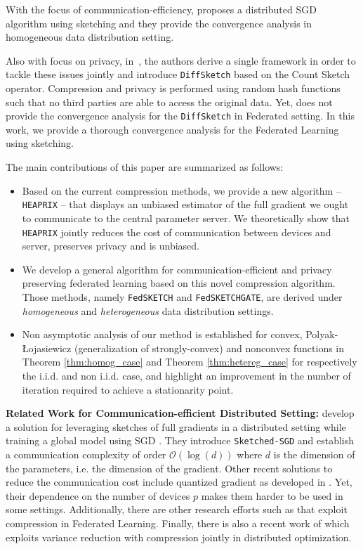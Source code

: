 \documentclass[review,onefignum,onetabnum]{siamart190516}
\newcommand{\pl}{Polyak-\L{}ojasiewicz}
\begin{document}
With the focus of communication-efficiency, \cite{ivkin2019communication} proposes a distributed SGD algorithm using sketching and they provide the convergence analysis in homogeneous data distribution setting. 

Also with focus on privacy,  in~\cite{li2019privacy}, the authors derive a single framework in order to tackle these issues jointly and introduce \texttt{DiffSketch} based on the Count Sketch operator. Compression and privacy is performed using random hash functions such that no third parties are able to access the original data. Yet, \cite{li2019privacy} does not provide the convergence analysis for the \texttt{DiffSketch} in Federated setting. In this work, we provide a thorough convergence analysis for the Federated Learning using sketching.

The main contributions of this paper are summarized as follows:
\begin{itemize}
    \item Based on the current compression methods, we provide a new algorithm -- \texttt{HEAPRIX} -- that displays an unbiased estimator of the full gradient we ought to communicate to the central parameter server. We theoretically show that \texttt{HEAPRIX} jointly reduces the cost of communication between devices and server, preserves privacy and is unbiased.
    
    \item We develop a general algorithm for communication-efficient and privacy preserving federated learning based on this novel compression algorithm. 
Those methods, namely \texttt{FedSKETCH} and \texttt{FedSKETCHGATE}, are derived under \textit{homogeneous} and \textit{heterogeneous} data distribution settings.
   
    \item Non asymptotic analysis of our method is established for convex, \pl\: (generalization of strongly-convex) and nonconvex functions in Theorem \ref{thm:homog_case} and Theorem \ref{thm:hetereg_case} for respectively the i.i.d. and non i.i.d. case,  and highlight an improvement in the number of iteration required to achieve a stationarity point.
\end{itemize}


\textbf{Related Work for Communication-efficient Distributed Setting:} \cite{ivkin2019communication} develop a solution for leveraging sketches of full gradients in a distributed setting while training a global model using SGD \cite{robbins1951stochastic, bottou2008tradeoffs}. They introduce \texttt{Sketched-SGD} and establish a communication complexity of order $\mathcal{O}(\log(d))$ where $d$ is the dimension of the parameters, i.e. the dimension of the gradient.
Other recent solutions to reduce the communication cost include quantized gradient as developed in \cite{alistarh2017qsgd,lin2017deep,stich2018sparsified}. Yet, their dependence on the number of devices $p$ makes them harder to be used in some settings. Additionally, there are other research efforts such as \cite{haddadpour2020federated,reisizadeh2019fedpaq,basu2019qsparse} that exploit compression in Federated Learning. Finally, there is also a recent work of \cite{horvath2020better} which exploits variance reduction with compression jointly in distributed optimization.
\end{document}
